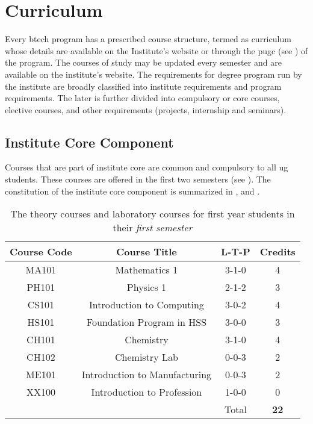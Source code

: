 \section{Curriculum}

Every \acrshort{btech} program has a prescribed course structure, termed as curriculum whose details are available on the Institute's website or through the \acrshort{pugc} (see ) of the \gls{program}. The courses of study may be updated every semester and are available on the \gls{institute}'s website. The requirements for degree program run by the \Gls{institute} are broadly classified into institute requirements and program requirements. The later is further divided into compulsory or core courses, elective courses, and other requirements (projects, internship and seminars). 

\subsection{Institute Core Component}

Courses that are part of institute core are common and compulsory to all \acrshort{ug} students. These courses are offered in the first two semesters (see ). The constitution of the institute core component is summarized in ,  and .

\begin{table}[b!]
    \centering
    \begin{tabular}{c c c c}
        \toprule
        \textbf{Course Code} &  \textbf{Course Title} & \textbf{L-T-P} & \textbf{Credits} \\
        \midrule
        MA101   & Mathematics 1                 & 3-1-0 & 4 \\
        PH101   & Physics 1                     & 2-1-2 & 3 \\
        CS101   & Introduction to Computing     & 3-0-2 & 4 \\
        HS101   & Foundation Program in HSS     & 3-0-0 & 3 \\
        CH101   & Chemistry                     & 3-1-0 & 4 \\
        CH102   & Chemistry Lab                 & 0-0-3 & 2 \\
        ME101   & Introduction to Manufacturing & 0-0-3 & 2 \\
        XX100   & Introduction to Profession    & 1-0-0 & 0 \\
        \midrule
        {}      & {}                            & Total & \textbf{22} \\
        \bottomrule
    \end{tabular}
    
    \caption{The theory courses and laboratory courses for first year students in their \textit{first semester}}
    \label{tab:first semester courses}
    
\end{table}

